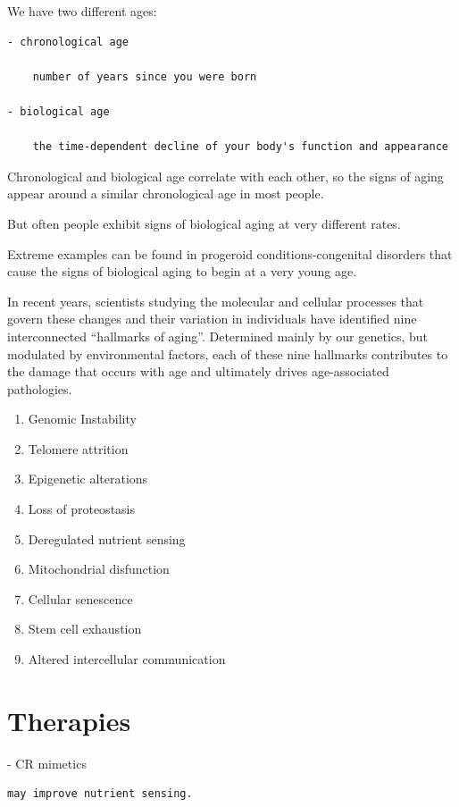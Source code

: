 \documentclass[
]{book}
\begin{document}
We have two different ages:

\begin{verbatim}
- chronological age

    number of years since you were born

- biological age

    the time-dependent decline of your body's function and appearance
\end{verbatim}

Chronological and biological age correlate with each other, so the signs of aging appear around a similar chronological age in most people.

But often people exhibit signs of biological aging at very different rates.

Extreme examples can be found in progeroid conditions-congenital disorders that cause the signs of biological aging to begin at a very young age.

In recent years, scientists studying the molecular and cellular processes that govern these changes and their variation in individuals have identified nine interconnected ``hallmarks of aging''. Determined mainly by our genetics, but modulated by environmental factors, each of these nine hallmarks contributes to the damage that occurs with age and ultimately drives age-associated pathologies.

\begin{enumerate}
\def\labelenumi{\arabic{enumi})}
\item
  Genomic Instability
\item
  Telomere attrition
\item
  Epigenetic alterations
\item
  Loss of proteostasis
\item
  Deregulated nutrient sensing
\item
  Mitochondrial disfunction
\item
  Cellular senescence
\item
  Stem cell exhaustion
\item
  Altered intercellular communication
\end{enumerate}

\hypertarget{therapies}{%
\section{Therapies}\label{therapies}}

- CR mimetics

\begin{verbatim}
may improve nutrient sensing.
\end{verbatim}
\end{document}
